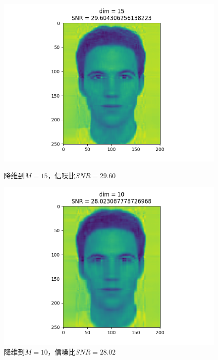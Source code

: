 \begin{figure}[htbp]
    \begin{minipage}[t]{0.3\linewidth}
        \centering
        \includegraphics[width=\textwidth]{figures/Figure_17.png}
        \caption{降维到$M=15$，信噪比$SNR=29.60$}
        \label{m15}
    \end{minipage}
    \begin{minipage}[t]{0.3\linewidth}
        \centering
        \includegraphics[width=\textwidth]{figures/Figure_18.png}
        \caption{降维到$M=10$，信噪比$SNR=28.02$}
        \label{m10}
    \end{minipage}
    \begin{minipage}[t]{0.3\linewidth}
        \centering

\end{minipage}
\end{figure}
